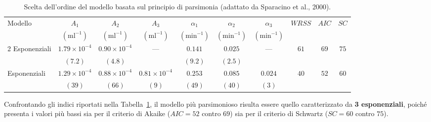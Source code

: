 \begin{table}[htbp]
\centering
\caption{Scelta dell'ordine del modello basata sul principio di parsimonia (adattato da Sparacino et al., 2000).}
\label{tab:parsimony}
{\footnotesize
\setlength{\tabcolsep}{3.2pt}
\begin{tabular}{@{}lccccccccc@{}}
\toprule
Modello & $A_{1}$ & $A_{2}$ & $A_{3}$ & $\alpha_{1}$ & $\alpha_{2}$ & $\alpha_{3}$ & $WRSS$ & $AIC$ & $SC$ \\
 & $(\mathrm{ml}^{-1})$ & $(\mathrm{ml}^{-1})$ & $(\mathrm{ml}^{-1})$ & $(\mathrm{min}^{-1})$ & $(\mathrm{min}^{-1})$ & $(\mathrm{min}^{-1})$ & & & \\
\midrule
2 Esponenziali & $1.79 \times 10^{-4}$ & $0.90 \times 10^{-4}$ & --- & $0.141$ & $0.025$ & --- & $61$ & $69$ & $75$ \\
 & $(7.2)$ & $(4.8)$ & & $(9.2)$ & $(2.5)$ & & & & \\
\addlinespace[4pt]
3 Esponenziali & $1.29 \times 10^{-4}$ & $0.88 \times 10^{-4}$ & $0.81 \times 10^{-4}$ & $0.253$ & $0.085$ & $0.024$ & $40$ & $52$ & $60$ \\
 & $(39)$ & $(66)$ & $(9)$ & $(49)$ & $(40)$ & $(3)$ & & & \\
\bottomrule
\end{tabular}
}
\end{table}

Confrontando gli indici riportati nella Tabella~\ref{tab:parsimony}, il modello più parsimonioso risulta essere quello caratterizzato da \textbf{3 esponenziali}, poiché presenta i valori più bassi sia per il criterio di Akaike ($AIC = 52$ contro $69$) sia per il criterio di Schwartz ($SC = 60$ contro $75$).